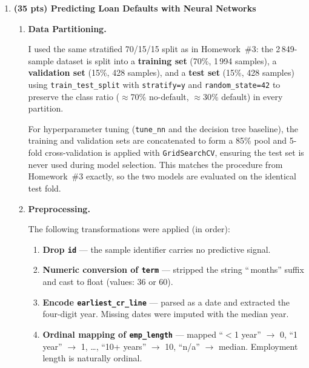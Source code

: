 \documentclass[a4paper,12pt]{article}
\begin{document}
\begin{enumerate}

\item \textbf{(35 pts) Predicting Loan Defaults with Neural Networks}

\begin{enumerate}[label=(\alph*)]

\item \textbf{Data Partitioning.}

I used the same stratified 70/15/15 split as in Homework~\#3:
the 2\,849-sample dataset is split into a \textbf{training set} (70\%, 1\,994 samples),
a \textbf{validation set} (15\%, 428 samples), and a \textbf{test set} (15\%, 428 samples)
using \texttt{train\_test\_split} with \texttt{stratify=y} and \texttt{random\_state=42}
to preserve the class ratio ($\approx$70\% no-default, $\approx$30\% default) in every
partition.

For hyperparameter tuning (\texttt{tune\_nn} and the decision tree baseline), the training
and validation sets are concatenated to form a 85\% pool and 5-fold cross-validation is
applied with \texttt{GridSearchCV}, ensuring the test set is never used during model
selection. This matches the procedure from Homework~\#3 exactly, so the two models are
evaluated on the identical test fold.

\item \textbf{Preprocessing.}

The following transformations were applied (in order):

\begin{enumerate}[label=\roman*.]
    \item \textbf{Drop \texttt{id}} — the sample identifier carries no predictive signal.

    \item \textbf{Numeric conversion of \texttt{term}} — stripped the string ``\,months''
    suffix and cast to float (values: 36 or 60).

    \item \textbf{Encode \texttt{earliest\_cr\_line}} — parsed as a date and extracted the
    four-digit year. Missing dates were imputed with the median year.

    \item \textbf{Ordinal mapping of \texttt{emp\_length}} — mapped
    ``$<$1 year'' $\to$ 0, ``1 year'' $\to$ 1, \ldots, ``10+ years'' $\to$ 10,
    ``n/a'' $\to$ median. Employment length is naturally ordinal.


\end{enumerate}
\end{enumerate}
\end{enumerate}
\end{document}
